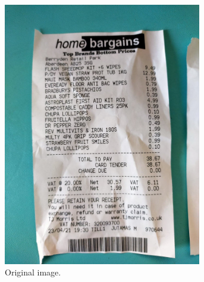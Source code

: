 \documentclass[
  digital, %
  table,   %
  oneside, %
  lof,     %
  lot,     %
]{fithesis3}
\begin{document}
    \begin{figure}[H]
        \centering
        \begin{subfigure}[t]{0.48\textwidth}
          \centering
          \includegraphics[width=0.95\textwidth]{figures/image_processing/original_image}
          \caption{Original image.}
        \end{subfigure}
        \begin{subfigure}[t]{0.37\textwidth}
          \centering

\end{subfigure}
\end{figure}
\end{document}
